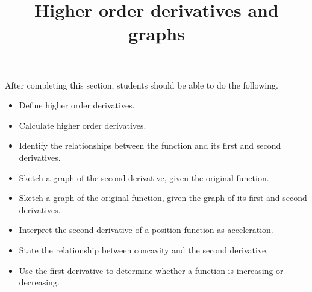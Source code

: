 \documentclass{ximera}
\title{Higher order derivatives and graphs}
\begin{document}
\begin{abstract}
\end{abstract}

\maketitle

\begin{sectionOutcomes}

After completing this section, students should be able to do the following.

\begin{itemize}
	\item Define higher order derivatives.
	\item Calculate higher order derivatives.
	\item Identify the relationships between the function and its first and second derivatives.
	\item Sketch a graph of the second derivative, given the original function.
	\item Sketch a graph of the original function, given the graph of its first and second derivatives.
	\item Interpret the second derivative of a position function as acceleration.
	\item State the relationship between concavity and the second derivative.
	\item Use the first derivative to determine whether a function is increasing or decreasing.
\end{itemize}

\end{sectionOutcomes}
\end{document}
